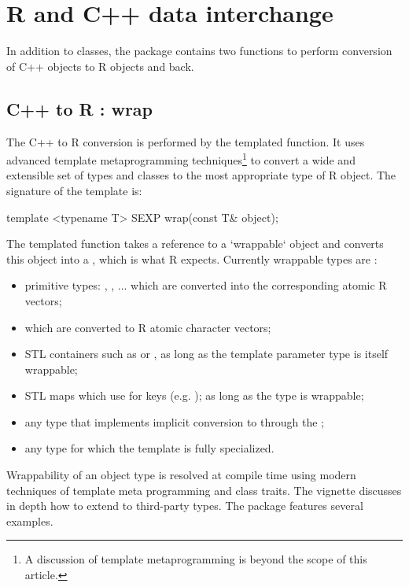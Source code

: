 \section{R and C++ data interchange}

In addition to classes, the  package contains two 
functions to perform conversion of C++ objects to R objects and back. 

\subsection{C++ to R : wrap}

The C++ to R conversion is performed by the  templated
function. It uses advanced template metaprogramming techniques\footnote{A
  discussion of template metaprogramming
  \citep{Vandevoorde+Josuttis:2003,Abrahams+Gurtovoy:2004} is beyond the
  scope of this article.}  to convert a wide and extensible set of types and
classes to the most appropriate type of R object. The signature of the
 template is:

\begin{example}
template <typename T> 
SEXP wrap(const T& object);
\end{example}

The templated function takes a reference to a `wrappable` 
object and converts this object into a , which is what R expects. 
Currently wrappable types are :
\begin{itemize}
\item primitive types: , , ... which are converted 
into the corresponding atomic R vectors;
\item {} which are converted to R atomic character vectors;
\item STL containers such as  or , 
as long as the template parameter type  is itself wrappable;
\item STL maps which use  for keys 
(e.g. ); as long as 
the type  is wrappable;
\item any type that implements implicit conversion to  through the 
;
\item any type for which the  template is %
fully specialized.
\end{itemize}

Wrappability of an object type is resolved at compile time using 
modern techniques of template meta programming and class traits. The 
 vignette discusses in depth how to extend 
to third-party types. The  package
\citep{cran:rcpparmadillo} features several examples.

